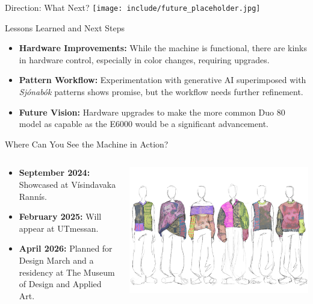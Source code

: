 \documentclass[
    NAME={Dr. Helga Ingimundardóttir},
    EMAIL={helgaingim@hi.is},
    FACULTY={Industrial Engineering},
    TITLE={HiDef Textiles: Reviving Tradition with Innovation},
    SUBTITLE={Empowering Creativity and Sustainability in Textile Production through Digital Transformation},
    SEMINAR={Reykjavík DataBeers},
    DATE={January 25, 2025},
    WIDE={true}
]{HI-LaTeX/hi-beamer}
\begin{document}
\begin{frame}{Direction: What Next?}
\centering
\texttt{[image: include/future\_placeholder.jpg]}
\end{frame}


\begin{frame}{Lessons Learned and Next Steps}
    \begin{itemize}
        \item \textbf{Hardware Improvements:} While the machine is functional, there are kinks in hardware control, especially in color changes, requiring upgrades.
        \item \textbf{Pattern Workflow:} Experimentation with generative AI superimposed with \emph{Sjónabók} patterns shows promise, but the workflow needs further refinement.
        \item \textbf{Future Vision:} Hardware upgrades to make the more common Duo 80 model as capable as the E6000 would be a significant advancement.
    \end{itemize}
\end{frame}

\begin{frame}{Where Can You See the Machine in Action?}
\begin{columns}
\begin{column}{0.6\linewidth}
    \begin{itemize}
        \item \textbf{September 2024:} Showcased at \alert{Vísindavaka Rannís}.
        \item \textbf{February 2025:} Will appear at \alert{UTmessan}.
        \item \textbf{April 2026:} Planned for \alert{Design March} and a residency at \alert{The Museum of Design and Applied Art}.
    \end{itemize}
\end{column}
\begin{column}{0.4\linewidth}
    \includegraphics[width=\textwidth]{include/gisa.JPG}
\end{column}
\end{columns}
\end{frame}
\end{document}
